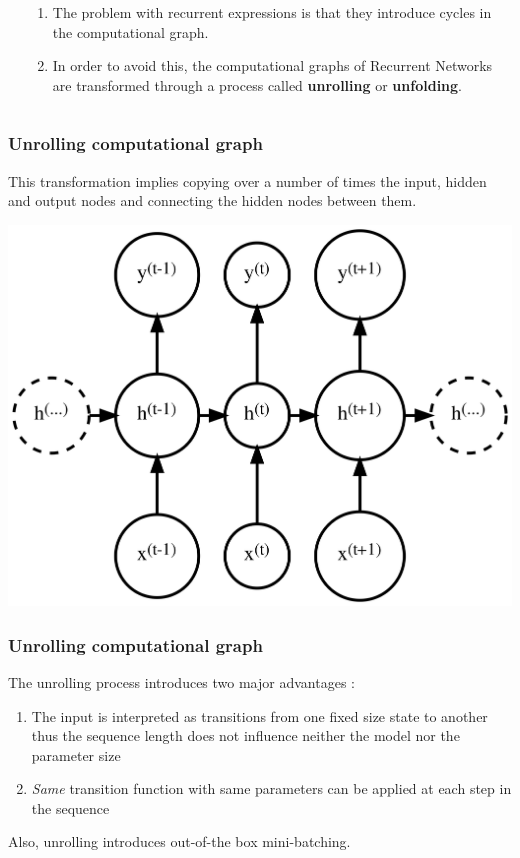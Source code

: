 \documentclass{beamer}
\begin{document}
\begin{frame}
\begin{columns}
\begin{column}{0.3\textwidth}
\begin{center}
      \end{center}
    \end{column}
    \begin{column}{0.7\textwidth}
      \begin{enumerate}
        \item The problem with recurrent expressions is that they introduce cycles in the computational graph.
        \item In order to avoid this, the computational graphs of Recurrent Networks are transformed through a process called \textbf{unrolling} or \textbf{unfolding}.
      \end{enumerate}
    \end{column}
  \end{columns}
\end{frame}
\begin{frame}
  \frametitle{Unrolling computational graph}
  This transformation implies copying over a number of times the input, hidden and output nodes and connecting the hidden nodes between them.
  \begin{center}
    \includegraphics[height=0.6\textheight]{../img/rnn-unrolled.png}
  \end{center}
\end{frame}
\begin{frame}
  \frametitle{Unrolling computational graph}
  The unrolling process introduces two major advantages \cite{goodfellow-et-al-2016}:
  \begin{enumerate}
    \item The input is interpreted as transitions from one fixed size state to another thus the sequence length does not influence neither the model nor the parameter size
    \item \textit{Same} transition function with same parameters can be applied at each step in the sequence
  \end{enumerate}
  Also, unrolling introduces out-of-the box mini-batching.
\end{frame}
\end{document}
